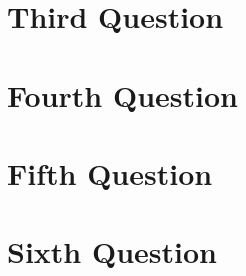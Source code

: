 \documentclass{article}
\begin{document}
\section*{Third Question}
\section*{Fourth Question}
\section*{Fifth Question}
\section*{Sixth Question}
\end{document}
